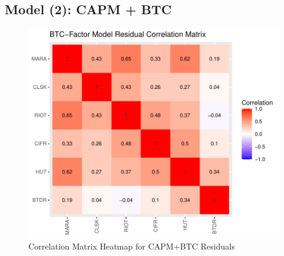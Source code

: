 \documentclass[]{article}
\begin{document}
\subsection{Model (2): CAPM + BTC}

\begin{figure}[htbp]
	\label{bfm_resid_corplot}
	\caption{Correlation Matrix Heatmap for CAPM+BTC Residuals}
	\includegraphics[width=\linewidth]{bfm_resid_corplot.pdf}
\end{figure}
\end{document}
